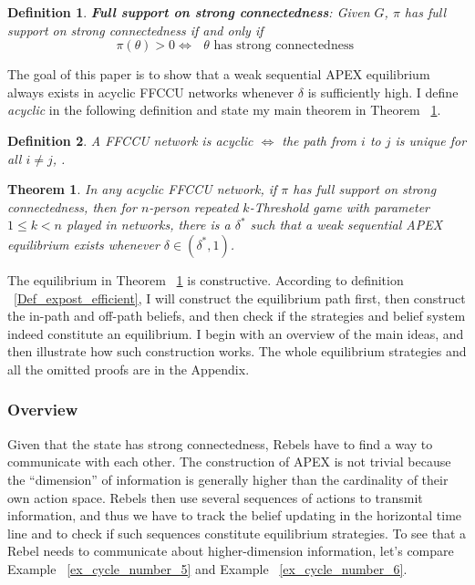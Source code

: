 \documentclass[12pt,letterpaper]{article}
\newtheorem{theorem}{Theorem}
\newtheorem{definition}{Definition}[section]
\theoremstyle{definition}
\theoremstyle{remark}
\theoremstyle{claim}
\begin{document}
\begin{definition}
\textbf{Full support on strong connectedness}: Given $G$, $\pi$ has full support on strong connectedness if and only if 
\[\pi(\theta)>0\Leftrightarrow \text{ $\theta$ has strong connectedness }\] 
\end{definition}  


The goal of this paper is to show that a weak sequential APEX equilibrium always exists in acyclic FFCCU networks whenever $\delta$ is sufficiently high. I define \textit{acyclic} in the following definition and state my main theorem in Theorem ~\ref{thm_main_result}. 
\begin{definition}
A FFCCU network is acyclic $\Leftrightarrow$ the path from $i$ to $j$ is unique for all $i\neq j$, . 
\end{definition}

\begin{theorem}
\label{thm_main_result}
In any acyclic FFCCU network, if $\pi$ has full support on strong connectedness, then for $n$-person repeated $k$-Threshold game with parameter $1\leq k < n$ played in networks, there is a $\delta^{*}$ such that a weak sequential APEX equilibrium exists whenever $\delta\in(\delta^{*},1)$.
\end{theorem}

The equilibrium in Theorem ~\ref{thm_main_result} is constructive. According to definition ~\ref{Def_expost_efficient}, I will construct the equilibrium path first, then construct the in-path and off-path beliefs, and then check if the strategies and belief system indeed constitute an equilibrium. I begin with an overview of the main ideas, and then illustrate how such construction works. The whole equilibrium strategies and all the omitted proofs are in the Appendix.  

\subsubsection{Overview}

Given that the state has strong connectedness, Rebels have to find a way to communicate with each other. The construction of APEX is not trivial because the ``dimension'' of information is generally higher than the cardinality of their own action space. Rebels then use several sequences of actions to transmit information, and thus we have to track the belief updating in the horizontal time line and to check if such sequences constitute equilibrium strategies. To see that a Rebel needs to communicate about higher-dimension information, let's compare Example ~\ref{ex_cycle_number_5} and Example ~\ref{ex_cycle_number_6}.
\end{document}
